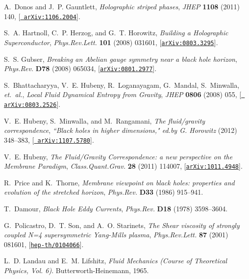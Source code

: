 \documentclass[12pt]{article}
\begin{document}
\begin{thebibliography}{100}
A.~Donos and J.~P. Gauntlett, {\it {Holographic striped phases}},  {\em JHEP}
  {\bf 1108} (2011) 140, [\href{http://xxx.lanl.gov/abs/1106.2004}{{\tt
  arXiv:1106.2004}}].

S.~A. Hartnoll, C.~P. Herzog, and G.~T. Horowitz, {\it {Building a Holographic
  Superconductor}},  {\em Phys.Rev.Lett.} {\bf 101} (2008) 031601,
  [\href{http://xxx.lanl.gov/abs/0803.3295}{{\tt arXiv:0803.3295}}].

S.~S. Gubser, {\it {Breaking an Abelian gauge symmetry near a black hole
  horizon}},  {\em Phys.Rev.} {\bf D78} (2008) 065034,
  [\href{http://xxx.lanl.gov/abs/0801.2977}{{\tt arXiv:0801.2977}}].

S.~Bhattacharyya, V.~E. Hubeny, R.~Loganayagam, G.~Mandal, S.~Minwalla, {\em
  et.~al.}, {\it {Local Fluid Dynamical Entropy from Gravity}},  {\em JHEP}
  {\bf 0806} (2008) 055, [\href{http://xxx.lanl.gov/abs/0803.2526}{{\tt
  arXiv:0803.2526}}].

V.~E. Hubeny, S.~Minwalla, and M.~Rangamani, {\it {The fluid/gravity
  correspondence}},  {\em ``Black holes in higher dimensions," ed.by G.
  Horowitz} (2012) 348--383, [\href{http://xxx.lanl.gov/abs/1107.5780}{{\tt
  arXiv:1107.5780}}].

V.~E. Hubeny, {\it {The Fluid/Gravity Correspondence: a new perspective on the
  Membrane Paradigm}},  {\em Class.Quant.Grav.} {\bf 28} (2011) 114007,
  [\href{http://xxx.lanl.gov/abs/1011.4948}{{\tt arXiv:1011.4948}}].

R.~Price and K.~Thorne, {\it {Membrane viewpoint on black holes: properties and
  evolution of the stretched horizon}},  {\em Phys.Rev.} {\bf D33} (1986)
  915--941.

T.~Damour, {\it {Black Hole Eddy Currents}},  {\em Phys.Rev.} {\bf D18} (1978)
  3598--3604.

G.~Policastro, D.~T. Son, and A.~O. Starinets, {\it {The Shear viscosity of
  strongly coupled N=4 supersymmetric Yang-Mills plasma}},  {\em
  Phys.Rev.Lett.} {\bf 87} (2001) 081601,
  [\href{http://xxx.lanl.gov/abs/hep-th/0104066}{{\tt hep-th/0104066}}].

L.~D. Landau and E.~M. Lifshitz, {\em {Fluid Mechanics (Course of Theoretical
  Physics, Vol. 6)}}.
\newblock Butterworth-Heinemann, 1965.


\end{thebibliography}
\end{document}

